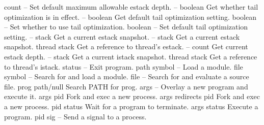 \begin{longtable}{}
\hline
\optableent
	{count}
	{{\bf {}}}
	{--}
	{Set default maximum allowable estack depth.}
\hline
\optableent
	{--}
	{{\bf {}}}
	{boolean}
	{Get whether tail optimization is in effect.}
\hline
\optableent
	{--}
	{{\bf {}}}
	{boolean}
	{Get default tail optimization setting.}
\hline
\optableent
	{boolean}
	{{\bf {}}}
	{--}
	{Set whether to use tail optimization.}
\hline
\optableent
	{boolean}
	{{\bf {}}}
	{--}
	{Set default tail optimization setting.}
\hline
\optableent
	{--}
	{{\bf {}}}
	{stack}
	{Get a current estack snapshot.}
\hline
\optableent
	{--}
	{{\bf {}}}
	{stack}
	{Get a current estack snapshot.}
\hline
\optableent
	{thread}
	{{\bf {}}}
	{stack}
	{Get a reference to thread's estack.}
\hline
\optableent
	{--}
	{{\bf {}}}
	{count}
	{Get current estack depth.}
\hline
\optableent
	{--}
	{{\bf {}}}
	{stack}
	{Get a current istack snapshot.}
\hline
\optableent
	{thread}
	{{\bf {}}}
	{stack}
	{Get a reference to thread's istack.}
\hline
\optableent
	{status}
	{{\bf {}}}
	{--}
	{Exit program.}
\hline
\optableent
	{path symbol}
	{{\bf {}}}
	{--}
	{Load a module.}
\hline
\optableent
	{file symbol}
	{{\bf {}}}
	{--}
	{Search for and load a module.}
\hline
\optableent
	{file}
	{{\bf {}}}
	{--}
	{Search for and evaluate a source file.}
\hline
\optableent
	{prog}
	{{\bf {}}}
	{path/null}
	{Search PATH for prog.}
\hline
\optableent
	{args}
	{{\bf {}}}
	{--}
	{Overlay a new program and execute it.}
\hline
\optableent
	{args}
	{{\bf {}}}
	{pid}
	{Fork and exec a new process.}
\hline
\optableent
	{args redirects}
	{{\bf {}}}
	{pid}
	{Fork and exec a new process.}
\hline
\optableent
	{pid}
	{{\bf {}}}
	{status}
	{Wait for a program to terminate.}
\hline
\optableent
	{args}
	{{\bf {}}}
	{status}
	{Execute a program.}
\hline
\optableent
	{pid sig}
	{{\bf {}}}
	{--}
	{Send a signal to a process.}

\end{longtable}
